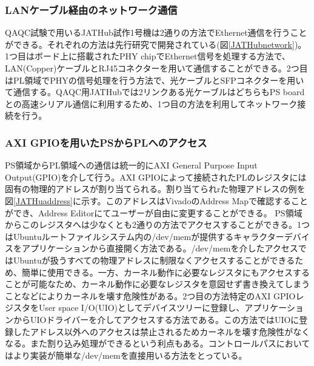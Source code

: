 \subsubsection{LANケーブル経由のネットワーク通信}
\label{subsubsec_network}
\baselineskip
QAQC試験で用いるJATHub試作1号機は2通りの方法でEthernet通信を行うことができる。それぞれの方法は先行研究で開発されている(図\ref{JATHubnetwork}\cite{mt_atanaka})。1つ目はボード上に搭載されたPHY chipでEthernet信号を処理する方法で、LAN(Copper)ケーブルとRJ45コネクターを用いて通信することができる。2つ目はPL領域でPHYの信号処理を行う方法で、光ケーブルとSFPコネクターを用いて通信する。QAQC用JATHubでは2リンクある光ケーブルはどちらもPS board との高速シリアル通信に利用するため、1つ目の方法を利用してネットワーク接続を行う。


\subsubsection{AXI GPIOを用いたPSからPLへのアクセス}
\label{subsubsec_axi}
PS領域からPL領域への通信は統一的にAXI General Purpose Input Output(GPIO)を介して行う。AXI GPIOによって接続されたPLのレジスタには固有の物理的アドレスが割り当てられる。割り当てられrた物理アドレスの例を図\ref{JATHuaddress}に示す。このアドレスはVivadoのAddress Mapで確認することができ、Address Editorにてユーザーが自由に変更することができる。
PS領域からこのレジスタへは少なくとも2通りの方法でアクセスすることができる。1つはUbuntuルートファイルシステム内の/dev/memが提供するキャラクターデバイスをアプリケーションから直接開く方法である。/dev/memを介したアクセスではUbuntuが扱うすべての物理アドレスに制限なくアクセスすることができるため、簡単に使用できる。一方、カーネル動作に必要なレジスタにもアクセスすることが可能なため、カーネル動作に必要なレジスタを意図せず書き換えてしまうことなどによりカーネルを壊す危険性がある。2つ目の方法特定のAXI GPIOレジスタをUser space I/O(UIO)としてデバイスツリーに登録し、アプリケーションからUIOドライバーを介してアクセスする方法である。この方法ではUIOに登録したアドレス以外へのアクセスは禁止されるためカーネルを壊す危険性がなくなる。また割り込み処理ができるという利点もある。コントロールパスにおいてはより実装が簡単な/dev/memを直接用いる方法をとっている。
\baselineskip

